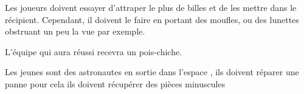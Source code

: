 \documentclass{grand-jeu}
\begin{document}
\begin{liste-materiel}
\end{liste-materiel}

\begin{regles}
Les joueurs doivent essayer d'attraper le plus de billes et de les mettre dans le récipient. Cependant, il doivent le faire en portant des moufles, ou des lunettes obstruant un peu la vue par exemple.

L’équipe qui aura réussi recevra un pois-chiche.
\end{regles}

\begin{imaginaire}
Les jeunes sont des astronautes en sortie dans l’espace , ils doivent réparer une panne pour cela ils doivent récupérer des pièces minuscules
\end{imaginaire}

\begin{moments-stop}
\end{moments-stop}
\end{document}
